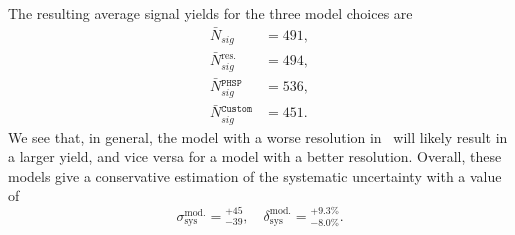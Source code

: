 The resulting average signal yields for the three model choices are
\begin{align}
\bar N {}_{sig} &= 491, \\
\bar N {}_{sig}^{\mathrm{res.}} &= 494, \\
\bar N {}_{sig}^{\mathtt{PHSP}} &= 536, \\
\bar N {}_{sig}^{\mathtt{Custom}} &= 451.
\end{align}
We see that, in general, the model with a worse resolution in \vars~will likely result in a larger yield, and vice versa for a model with a better resolution. Overall, these models give a conservative estimation of the systematic uncertainty with a value of 
\begin{equation}
\sigma_{\mathrm{sys}}^{\mathrm{mod.}} = {}^{+45}_{-39},\quad \delta_{\mathrm{sys}}^{\mathrm{mod.}} = {}^{+9.3\%}_{-8.0\%}.
\end{equation}

